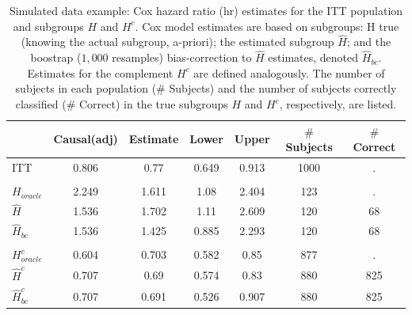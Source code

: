 \documentclass[smallextended]{svjour3}
\begin{document}
\begin{table}

\caption{\label{tab:simex_tab}\label{tab:simex} Simulated data example: Cox hazard ratio (hr) estimates for the ITT population and subgroups $H$ and $H^{c}$.
Cox model estimates are based on subgroups: H true (knowing the actual subgroup, a-priori); the estimated subgroup $\hat{H}$; and 
the boostrap ($1,000$ resamples) bias-correction to $\hat{H}$ estimates, denoted $\hat{H}_{bc}$.  Estimates for the complement $H^{c}$ are defined analogously.
The number of subjects in each population ($\#$ Subjects) and the number of subjects correctly classified ($\#$ Correct) in the true subgroups $H$ and $H^{c}$, respectively, are listed.}
\centering
\fontsize{9}{11}\selectfont
\begin{tabular}[t]{lcccccc}
\toprule
  & Causal(adj) & Estimate & Lower & Upper & $\#$ Subjects & $\#$ Correct\\
\midrule
ITT & 0.806 & 0.77 & 0.649 & 0.913 & 1000 & .\\
\addlinespace[0.3em]
\multicolumn{7}{l}{\textbf{H subgroup estimates}}\\
\hspace{1em}$H_{oracle}$ & 2.249 & 1.611 & 1.08 & 2.404 & 123 & .\\
\hspace{1em}$\hat{H}$ & 1.536 & 1.702 & 1.11 & 2.609 & 120 & 68\\
\hspace{1em}$\hat{H}_{bc}$ & 1.536 & 1.425 & 0.885 & 2.293 & 120 & 68\\
\addlinespace[0.3em]
\multicolumn{7}{l}{\textbf{H-complement subgroup estimates}}\\
\hspace{1em}$H^{c}_{oracle}$ & 0.604 & 0.703 & 0.582 & 0.85 & 877 & .\\
\hspace{1em}$\hat{H}^{c}$ & 0.707 & 0.69 & 0.574 & 0.83 & 880 & 825\\
\hspace{1em}$\hat{H}^{c}_{bc}$ & 0.707 & 0.691 & 0.526 & 0.907 & 880 & 825\\
\bottomrule
\end{tabular}
\end{table}





\end{document}
